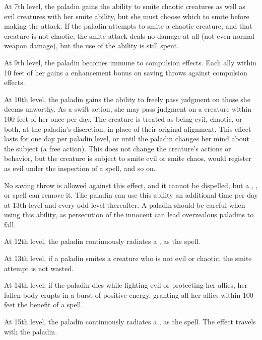  At 7th level, the paladin gains the ability to smite chaotic creatures as well as evil creatures with her smite ability, but she must choose which to smite before making the attack. If the paladin attempts to smite a chaotic creature, and that creature is not chaotic, the smite attack deals no damage at all (not even normal weapon damage), but the use of the ability is still spent.

 At 9th level, the paladin becomes immune to compulsion effects. Each ally within 10 feet of her gains a  enhancement bonus on saving throws against compulsion effects.

 At 10th level, the paladin gains the ability to freely pass judgment on those she deems unworthy. As a swift action, she may pass judgment on a creature within 100 feet of her once per day. The creature is treated as being evil, chaotic, or both, at the paladin's discretion, in place of their original alignment. This effect lasts for one day per paladin level, or until the paladin changes her mind about the subject (a free action). This does not change the creature's actions or behavior, but the creature is subject to smite evil or smite chaos, would register as evil under the inspection of a  spell, and so on.

No saving throw is allowed against this effect, and it cannot be dispelled, but a , , or  spell can remove it. The paladin can use this ability an additional time per day at 13th level and every odd level thereafter. A paladin should be careful when using this ability, as persecution of the innocent can lead overzealous paladins to fall.

 At 12th level, the paladin continuously radiates a , as the spell.

 At 13th level, if a paladin smites a creature who is not evil or chaotic, the smite attempt is not wasted.

 At 14th level, if the paladin dies while fighting evil or protecting her allies, her fallen body erupts in a burst of positive energy, granting all her allies within 100 feet the benefit of a  spell.

 At 15th level, the paladin continuously radiates a , as the spell. The effect travels with the paladin.

